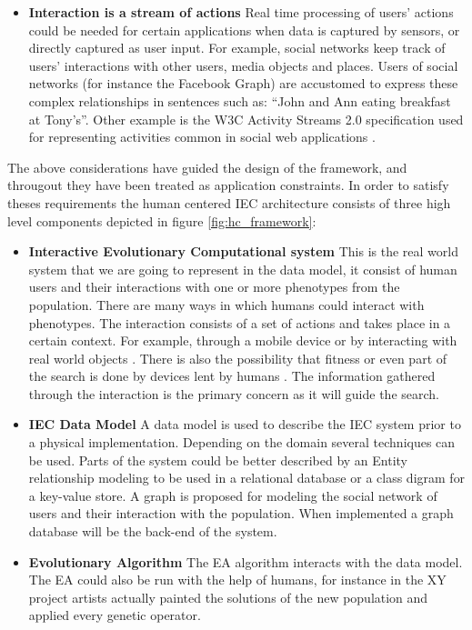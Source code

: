 \begin{itemize}
\item {\bf Interaction is a stream of actions}
  Real time processing of users' actions could be needed for certain applications when data is 
  captured by sensors, or directly captured as user input. For example, social networks keep
  track of users' interactions with other users, media objects and places. Users of 
  social networks (for instance the Facebook Graph) are accustomed to express these 
  complex relationships in sentences such as: ``John and Ann eating breakfast at Tony's''. 
  Other example is the W3C Activity Streams 2.0 specification used for representing activities 
  common in social web applications \cite{json:streams}. 
\end{itemize}

The above considerations have guided the design of the framework, and througout they have been
treated as application constraints. In order to satisfy theses requirements the
human centered IEC architecture consists of three high level components depicted
in figure \ref{fig:hc_framework}:

\begin{itemize}
  \item {\bf Interactive Evolutionary Computational system} 
  This is the real world system that we are going to represent in the data model, 
  it consist of human users and their interactions with one or more phenotypes
  from the population. There are many ways in which humans could interact 
  with phenotypes. The interaction consists of a set of actions and 
  takes place in a certain context. For example, through a mobile device  
  or by interacting with real world objects 
  \cite{de2014artists,de2013unplugging}. 
  There is also the possibility that fitness or even part of the search 
  is done by devices lent by humans \cite{DBLP:conf/gecco/MereloCGCRV16}.
  The information gathered through the interaction is the primary concern
  as it will guide the search. 

  \item {\bf IEC Data Model}
  A data model is used to describe the IEC system prior to a physical 
  implementation.  Depending on the domain several techniques can be used.
  Parts of the system could be better described by an Entity relationship 
  modeling to be used in a relational database or a class digram for a 
  key-value store. A graph is proposed for modeling the social network of users 
  and their interaction with the population. When implemented a graph database 
  will be the back-end of the system. 

  \item {\bf Evolutionary Algorithm} 
  The EA algorithm interacts with the data model. The EA could also be run with the help of
  humans, for instance in the XY project \cite{de2013unplugging} artists actually painted
  the solutions of the new population and applied every genetic operator.
\end{itemize}

